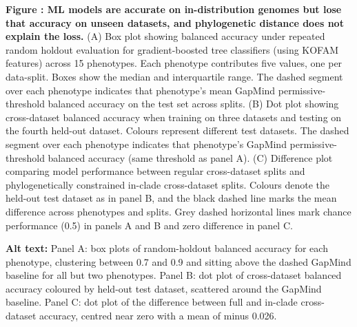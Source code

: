 \label{fig:ml_performance}%
\noindent\textbf{Figure : ML models are accurate on in-distribution genomes but lose that accuracy on unseen datasets, and phylogenetic distance does not explain the loss.}
(A) Box plot showing balanced accuracy under repeated random holdout evaluation for gradient-boosted tree classifiers (using KOFAM features) across 15 phenotypes.
Each phenotype contributes five values, one per data-split.
Boxes show the median and interquartile range.
The dashed segment over each phenotype indicates that phenotype's mean GapMind permissive-threshold balanced accuracy on the test set across splits.
(B) Dot plot showing cross-dataset balanced accuracy when training on three datasets and testing on the fourth held-out dataset.
Colours represent different test datasets.
The dashed segment over each phenotype indicates that phenotype's GapMind permissive-threshold balanced accuracy (same threshold as panel A).
(C) Difference plot comparing model performance between regular cross-dataset splits and phylogenetically constrained in-clade cross-dataset splits.
Colours denote the held-out test dataset as in panel B, and the black dashed line marks the mean difference across phenotypes and splits.
Grey dashed horizontal lines mark chance performance (0.5) in panels A and B and zero difference in panel C.

\noindent\textbf{Alt text:} Panel A: box plots of random-holdout balanced accuracy for each phenotype, clustering between 0.7 and 0.9 and sitting above the dashed GapMind baseline for all but two phenotypes. Panel B: dot plot of cross-dataset balanced accuracy coloured by held-out test dataset, scattered around the GapMind baseline. Panel C: dot plot of the difference between full and in-clade cross-dataset accuracy, centred near zero with a mean of minus 0.026.
\par\medskip

